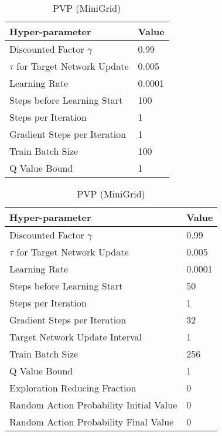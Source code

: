 \begin{table}[H]
\begin{small}
\begin{minipage}{0.45\linewidth}
\centering
\caption{PVP (GTA V)}
\begin{tabular}{@{}ll@{}}
\toprule
Hyper-parameter             & Value  \\ \midrule
Discounted Factor $\gamma$   & 0.99  \\
$\tau$ for Target Network Update & 0.005 \\
Learning Rate               & 0.0001 \\ 
Steps before Learning Start & 100\\
Steps per Iteration & 1\\
Gradient Steps per Iteration & 1\\
Train Batch Size & 100  \\
Q Value Bound & 1 \\
\bottomrule
\end{tabular}
\end{minipage}\hfill
\begin{minipage}{0.45\linewidth}
\centering
\caption{PVP (MiniGrid)}
\begin{tabular}{@{}ll@{}}
\toprule
Hyper-parameter             & Value  \\ \midrule
Discounted Factor $\gamma$   & 0.99  \\
$\tau$ for Target Network Update & 0.005 \\
Learning Rate               & 0.0001 \\ 
Steps before Learning Start & 50\\
Steps per Iteration & 1\\
Gradient Steps per Iteration & 32\\
Target Network Update Interval & 1\\
Train Batch Size & 256  \\
Q Value Bound & 1 \\
Exploration Reducing Fraction & 0 \\
Random Action Probability Initial Value & 0 \\
Random Action Probability Final Value & 0 \\
\bottomrule
\end{tabular}
\end{minipage}
\end{small}
\end{table}



